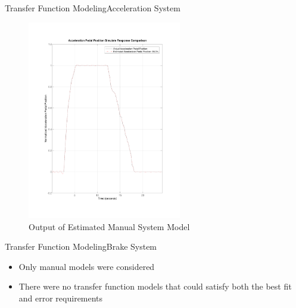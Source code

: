 \documentclass{beamer}
\begin{document}
\begin{frame}{Transfer Function Modeling}{Acceleration System}
\begin{block}{}
\begin{figure}
\begin{minipage}{0.45\textwidth}
        \includegraphics[width=0.6\textwidth]{figs/img/manualAccelTransferFunctionModel} %
        \caption{Output of Estimated Manual System Model}
        \label{fig:manualAccelModel}
    \end{minipage}
\end{figure}
  \end{block}
\end{frame}



\begin{frame}{Transfer Function Modeling}{Brake System}
\begin{block}{}
 \begin{itemize}
	\item Only manual models were considered 
	\item There were no transfer function models that could satisfy both the best fit and error requirements 
 \end{itemize}
  \end{block}
\end{frame}
\end{document}
